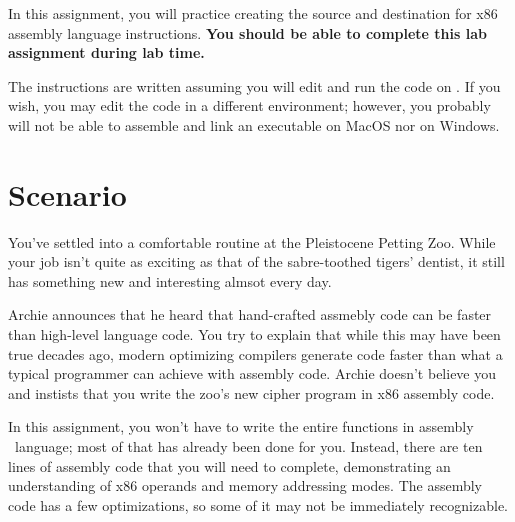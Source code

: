 


\renewcommand{\labnumber}{5}
\renewcommand{\labname}{x86 Addressing Modes Lab}
\renewcommand{\shortlabname}{addressinglab}
\renewcommand{\collaborationrules}{\individualeffort}
\renewcommand{\duedate}{Week of March 8, before the start of your lab section}
\startdocument




In this assignment, you will practice creating the source and destination for
x86 assembly language instructions. \textbf{You should be able to complete this
lab assignment during lab time.}

The instructions are written assuming you will edit and run the code on
\runtimeenvironment. If you wish, you may edit the code in a different
environment; however, you probably will not be able to assemble and link an
executable on MacOS nor on Windows.

\section*{Scenario}

You've settled into a comfortable routine at the Pleistocene Petting Zoo. While
your job isn't quite as exciting as that of the sabre-toothed tigers' dentist,
it still has something new and interesting almsot every day.

Archie announces that he heard that hand-crafted assmebly code can be faster
than high-level language code. You try to explain that while this may have been
true decades ago, modern optimizing compilers generate code faster than what a
typical programmer can achieve with assembly code. Archie doesn't believe you
and instists that you write the zoo's new cipher program in x86 assembly code.

\hspace{1cm}

In this assignment, you won't have to write the entire functions in assembly \
language; most of that has already been done for you. Instead, there are ten
lines of assembly code that you will need to complete, demonstrating an
understanding of x86 operands and memory addressing modes. The assembly code
has a few optimizations, so some of it may not be immediately recognizable.


